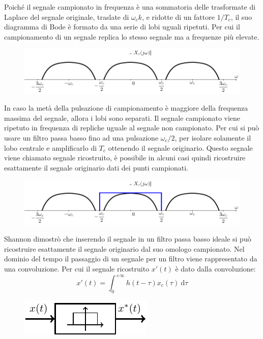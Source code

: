 \documentclass{article}
\numberwithin{equation}{subsection}
\newcommand{\df}{\mathrm{d}}
\begin{document}
Poiché il segnale campionato in frequenza è una sommatoria delle trasformate di Laplace del segnale originale, traslate di $\omega_ck$, e ridotte di un fattore 
${1}/{T_c}$, il suo diagramma di Bode è formato da una serie di lobi uguali ripetuti. Per cui il campionamento di un segnale replica lo stesso segnale 
ma a frequenze più elevate. 
\begin{figure}[H]%
    \centering
    \includegraphics{replicato-2.pdf}%
\end{figure}
In caso la metà della pulsazione di campionamento è maggiore della frequenza massima del segnale, allora i lobi 
sono separati. Il segnale campionato viene ripetuto in frequenza di repliche uguale al segnale non campionato. Per cui si può usare un filtro passa basso fino ad una pulsazione 
${\omega_c}/{2}$, per isolare solamente il lobo centrale e amplificarlo di $T_c$ ottenendo il segnale originario. 
Questo segnale viene chiamato segnale ricostruito, è possibile in alcuni casi quindi ricostruire esattamente il segnale originario dati dei punti campionati. 
\begin{figure}[H]%
    \centering
    \includegraphics{replicato.pdf}%
\end{figure}
Shannon dimostrò che inserendo il segnale in un filtro passa basso ideale si può ricostruire esattamente il segnale originario dal suo omologo campionato. 
Nel dominio del tempo il passaggio di un segnale per un filtro viene rappresentato da una convoluzione. Per cui il segnale ricostruito $x'(t)$ è dato dalla convoluzione: 
\begin{equation*}
    x'(t)=\displaystyle\int_0^{+\infty}h(t-\tau)x_c(\tau)\:\df\tau
\end{equation*}
\begin{figure}[H]%
    \centering
    \includegraphics{filtro.pdf}%
\end{figure}
\end{document}
